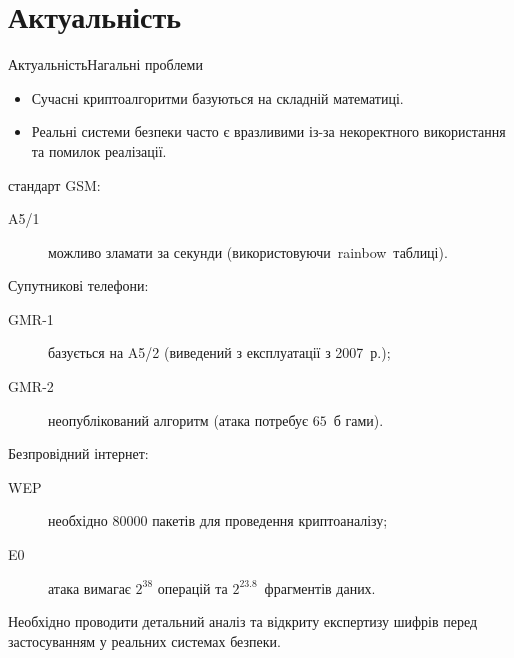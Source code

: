 \documentclass[10pt, ucs]{beamer}
\title[Криптографічні властивості симетричних шифрів]{\worktitle}
\subtitle{Бакалаврська робота}
\institute[ХНУРЕ]{}
\date[Харків 2013]{\normalsize Харків 2013}
\begin{document}
\maketitle

\section{Актуальність}
\begin{frame}{Актуальність}{Нагальні проблеми}
    \small
    \begin{block}{}
        \begin{itemize}
            \item Сучасні криптоалгоритми базуються на складній математиці.
            \item Реальні системи безпеки часто є вразливими із-за некоректного
                використання та помилок реалізації.
        \end{itemize}
    \end{block}
    \alert{стандарт GSM:}
    \begin{description}
        \item[A5/1] можливо зламати за секунди
            (використовуючи~rainbow~таблиці).
    \end{description}
    \alert{Супутникові телефони:}
    \begin{description}
        \item[GMR-1] базується на A5/2 (виведений з експлуатації з 2007~р.);
        \item[GMR-2] неопублікований алгоритм (атака потребує $65$~б гами).
    \end{description}
    \alert{Безпровідний інтернет:}
    \begin{description}
        \item [WEP] необхідно $80000$ пакетів для проведення криптоаналізу;
        \item[E0] атака вимагає $2^{38}$ операцій та $2^{23.8}$~фрагментів
            даних.
    \end{description}
    \begin{block}{}
        Необхідно проводити детальний аналіз та відкриту експертизу шифрів
        перед застосуванням у реальних системах безпеки.
    \end{block}
\end{frame}
\end{document}
